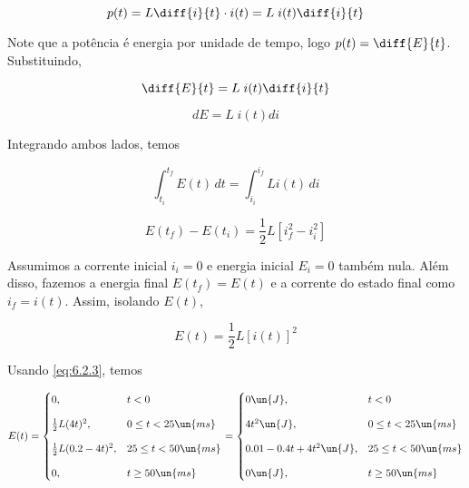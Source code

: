 \[ p(t) = L\diff{i}{t} \cdot i(t) = L\;i(t)\diff{i}{t}  \]

Note que a potência é energia por unidade de tempo, logo $p(t) = \diff{E}{t}$. Substituindo,

\[ \diff{E}{t} = L\;i(t)\diff{i}{t}  \]

\[ dE = L\;i(t)di  \]

Integrando ambos lados, temos

\[ \int_{t_i}^{t_f} E(t) \,dt = \int_{i_i}^{i_f} Li(t) \,di  \]

\[ E(t_f) - E(t_i) = \frac{1}{2}L\left[i_f^2 - i_i^2\right]  \]

Assumimos a corrente inicial $i_i =0$ e energia inicial $E_i = 0$ também nula. Além disso, fazemos
a energia final $E(t_f) = E(t)$ e a corrente do estado final como $i_f = i(t)$. Assim, isolando $E(t)$,

\begin{equation}\label{eq:6.2.3}
    E(t) = \frac{1}{2}L\left[i(t)\right]^2
\end{equation}

Usando \eqref{eq:6.2.3}, temos 

\[ E(t) =
    \begin{cases}
        0,   & t < 0                 \\
        \noalign{\vskip9pt}
        \frac{1}{2}L(4t)^2,  & 0 \leq t < 25 \un{ms} \\
        \noalign{\vskip9pt}
        \frac{1}{2}L(0.2 - 4t)^2, & 25 \leq t < 50 \un{ms} \\
        \noalign{\vskip9pt}
        0,   & t \geq 50 \un{ms}
    \end{cases}
    =
    \begin{cases}
        0 \un{J},   & t < 0                 \\
        \noalign{\vskip9pt}
        4t^2 \un{J},  & 0 \leq t < 25 \un{ms} \\
        \noalign{\vskip9pt}
        0.01 - 0.4t + 4t^2 \un{J}, & 25 \leq t < 50 \un{ms} \\
        \noalign{\vskip9pt}
        0 \un{J},   & t \geq 50 \un{ms}
    \end{cases}
\]





